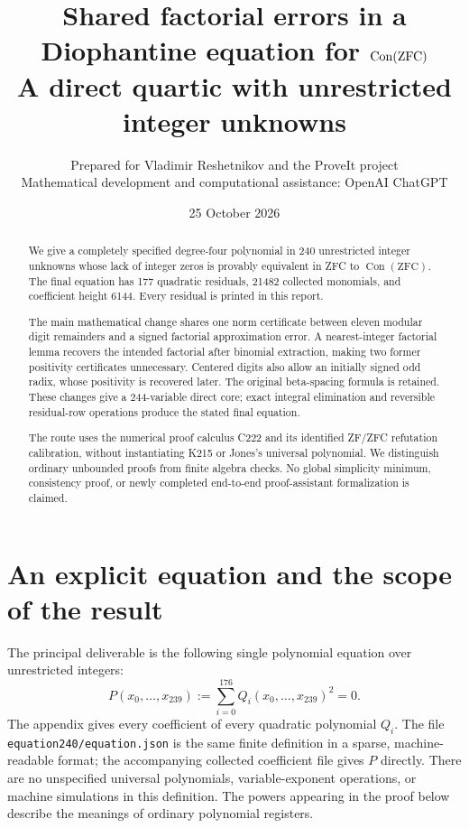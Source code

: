 \documentclass[11pt]{article}
\title{\textbf{Shared factorial errors in a Diophantine equation for
\(\Con(\ZFC)\)}\\[5pt]\large A direct quartic with \MainVars{} unrestricted
integer unknowns}
\author{Prepared for Vladimir Reshetnikov and the ProveIt project\\
\small Mathematical development and computational assistance: OpenAI ChatGPT}
\date{25 October 2026}
\theoremstyle{definition}\newtheorem{definition}[theorem]{Definition}
\newcommand{\Con}{\operatorname{Con}}\newcommand{\ZFC}{\mathrm{ZFC}}
\newcommand{\MainVars}{240}
\newcommand{\MainLast}{239}
\newcommand{\MainRows}{177}
\newcommand{\MainRowLast}{176}
\newcommand{\MainTerms}{21482}
\newcommand{\MainHeight}{6144}
\newcommand{\MainDir}{equation240}
\begin{document}
\maketitle
\begin{abstract}
We give a completely specified degree-four polynomial in \MainVars{}
unrestricted integer unknowns whose lack of integer zeros is provably
equivalent in ZFC to \(\Con(\ZFC)\). The final equation has \MainRows{}
quadratic residuals, \MainTerms{} collected monomials, and coefficient
height \MainHeight{}. Every residual is printed in this report.

The main mathematical change shares one norm certificate between eleven
modular digit remainders and a signed factorial approximation error.
A nearest-integer factorial lemma recovers the intended factorial after
binomial extraction, making two former positivity certificates unnecessary.
Centered digits also allow an initially signed odd radix, whose positivity
is recovered later. The original beta-spacing formula is retained.
These changes give a 244-variable direct core; exact integral elimination
and reversible residual-row operations produce the stated final equation.

The route uses the numerical proof calculus C222 and its identified ZF/ZFC
refutation calibration, without instantiating K215 or Jones's universal
polynomial. We distinguish ordinary unbounded proofs from finite algebra
checks. No global simplicity minimum, consistency proof, or newly completed
end-to-end proof-assistant formalization is claimed.
\end{abstract}
\newpage\tableofcontents\newpage
\section{An explicit equation and the scope of the result}

The principal deliverable is the following single polynomial equation over
unrestricted integers:
\begin{equation}\label{eq:main-definition}
 P(x_0,\ldots,x_{\MainLast})
   :=\sum_{i=0}^{\MainRowLast}Q_i(x_0,\ldots,x_{\MainLast})^2=0.
\end{equation}
The appendix gives every coefficient of every quadratic polynomial \(Q_i\).
The file \texttt{\MainDir/\allowbreak equation.json} is the same finite definition in a
sparse, machine-readable format; the accompanying collected coefficient
file gives \(P\) directly. There are no unspecified universal polynomials,
variable-exponent operations, or machine simulations in this definition.
The powers appearing in the proof below describe the meanings of ordinary
polynomial registers.
\end{document}

